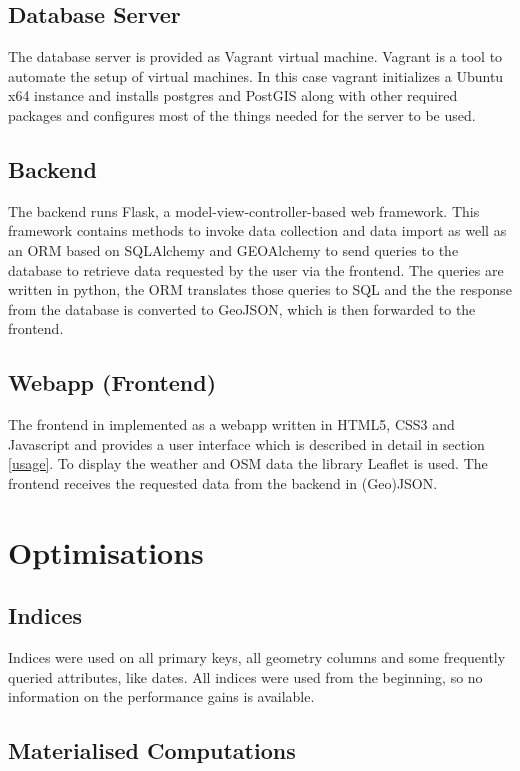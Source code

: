 \documentclass[paper=a4, fontsize=11pt]{article} %
\numberwithin{equation}{section} %
\numberwithin{figure}{section} %
\numberwithin{table}{section} %
\begin{document}
\subsection{Database Server}
The database server is provided as Vagrant virtual machine. Vagrant is a tool to automate the setup of virtual machines. In this case vagrant initializes a Ubuntu x64 instance and installs postgres and PostGIS along with other required packages and configures most of the things needed for the server to be used.
\subsection{Backend}
The backend runs Flask, a model-view-controller-based web framework. This framework contains methods to invoke data collection and data import as well as an ORM based on SQLAlchemy and GEOAlchemy to send queries to the database to retrieve data requested by the user via the frontend. The queries are written in python, the ORM translates those queries to SQL and the the response from the database is converted to GeoJSON, which is then forwarded to the frontend.
\subsection{Webapp (Frontend)}\label{subsec:webapp}
The frontend in implemented as a webapp written in HTML5, CSS3 and Javascript and provides a user interface which is described in detail in section \ref{usage}. To display the weather and OSM data the library Leaflet is used. The frontend receives the requested data from the backend in (Geo)JSON.


\section{Optimisations}\label{sec:optimisation}

\subsection{Indices}

Indices were used on all primary keys, all geometry columns and some frequently queried attributes, like dates. All indices were used from the beginning, so no information on the performance gains is available.

\subsection{Materialised Computations}\label{subsec:opticontrib}
\end{document}
